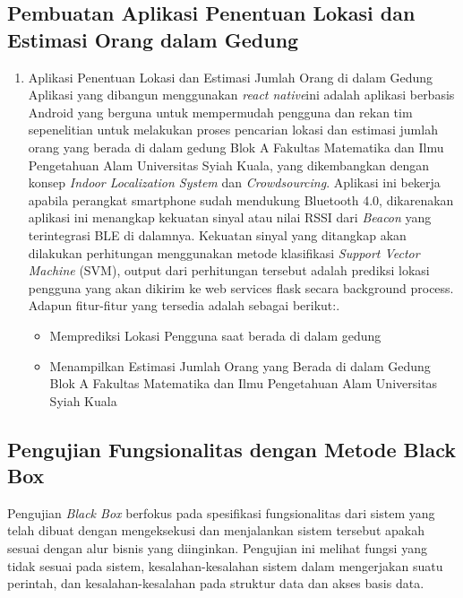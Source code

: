 \subsection{Pembuatan Aplikasi Penentuan Lokasi dan Estimasi Orang dalam Gedung}
\begin{enumerate}


	\item Aplikasi Penentuan Lokasi dan Estimasi Jumlah Orang di dalam Gedung
	      \newline
	      Aplikasi yang dibangun menggunakan \textit{react native}ini adalah aplikasi berbasis Android yang berguna untuk mempermudah pengguna dan rekan tim sepenelitian untuk melakukan proses
	      pencarian lokasi dan estimasi jumlah orang yang berada di dalam gedung Blok A Fakultas Matematika dan Ilmu Pengetahuan Alam Universitas Syiah Kuala, yang dikembangkan dengan konsep \textit{Indoor Localization System} dan \textit{Crowdsourcing}. Aplikasi ini bekerja apabila perangkat smartphone sudah mendukung Bluetooth 4.0, dikarenakan aplikasi ini menangkap kekuatan sinyal atau nilai RSSI dari \textit{Beacon} yang terintegrasi BLE di dalamnya. Kekuatan sinyal yang ditangkap akan dilakukan perhitungan menggunakan metode klasifikasi \textit{Support Vector Machine} (SVM), output dari perhitungan tersebut adalah prediksi lokasi pengguna yang akan dikirim ke web services flask secara background process. Adapun fitur-fitur yang tersedia adalah sebagai berikut:.

	      \begin {itemize}
	      \itemsep0em
	\item Memprediksi Lokasi Pengguna saat berada di dalam gedung\newline

	\item Menampilkan Estimasi Jumlah Orang yang Berada di dalam Gedung Blok A Fakultas Matematika dan Ilmu Pengetahuan Alam Universitas Syiah Kuala

	      \end{itemize}
\end{enumerate}
\subsection{Pengujian Fungsionalitas dengan Metode Black Box}
\par Pengujian \textit{Black Box} berfokus pada spesifikasi fungsionalitas dari sistem yang telah dibuat dengan mengeksekusi dan menjalankan sistem tersebut apakah sesuai dengan alur bisnis yang diinginkan. Pengujian ini melihat fungsi yang tidak sesuai pada sistem, kesalahan-kesalahan sistem dalam mengerjakan suatu perintah, dan kesalahan-kesalahan pada struktur data dan akses basis data.

